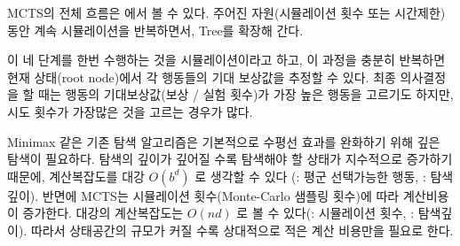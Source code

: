\documentclass[letterpaper,10pt,english]{sphinxmanual}
\begin{document}
\def\sphinxLiteralBlockLabel{\label{\detokenize{04-mcts:mcts-code}}\label{\detokenize{04-mcts:id9}}}
%
\begin{sphinxVerbatim}[commandchars=\\\{\}]
   
  
  
 
              

     
     
     
    
     
\end{sphinxVerbatim}

MCTS의 전체 흐름은 {\hyperref[\detokenize{04-mcts:mcts-code}]{}} 에서 볼 수 있다. 주어진 자원(시뮬레이션 횟수 또는 시간제한)동안
계속 시뮬레이션을 반복하면서, Tree를 확장해 간다.

이 네 단계를 한번 수행하는 것을 시뮬레이션이라고 하고, 이 과정을 충분히 반복하면 현재 상태(root node)에서 각 행동들의
기대 보상값을 추정할 수 있다. 최종 의사결정을 할 때는 행동의 기대보상값(보상 / 실험 횟수)가 가장 높은 행동을 고르기도 하지만,
시도 횟수가 가장많은 것을 고르는 경우가 많다.

Minimax 같은 기존 탐색 알고리즘은 기본적으로 수평선 효과를 완화하기 위해 깊은 탐색이 필요하다.
탐색의 깊이가 깊어질 수록 탐색해야 할 상태가 지수적으로 증가하기 때문에,
계산복잡도를 대강 \(O(b^d)\) 로 생각할 수 있다 (: 평군 선택가능한 행동, : 탐색깊이).
반면에 MCTS는 시뮬레이션 횟수(Monte-Carlo 샘플링 횟수)에 따라 계산비용이 증가한다.
대강의 계산복잡도는 \(O(nd)\) 로 볼 수 있다(: 시뮬레이션 횟수, : 탐색깊이).
따라서 상태공간의 규모가 커질 수록 상대적으로 적은 계산 비용만을 필요로 한다.
\end{document}
